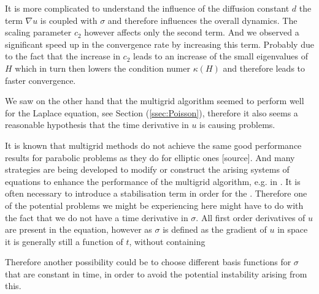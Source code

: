 \documentclass[../draft_1.tex]{subfiles}
\begin{document}
It is more complicated to understand the influence of the diffusion constant $d$ the term $\nabla u$ is coupled with $\sigma$ and therefore influences the overall dynamics. The scaling parameter $c_2$ however affects only the second term. And we observed a significant speed up in the convergence rate by increasing this term. Probably due to the fact that the increase in $c_2$ leads to an increase of the small eigenvalues of $H$ which in turn then lowers the condition numer $\kappa(H)$ and therefore leads to faster convergence. 


We saw on the other hand that the multigrid algorithm seemed to perform well for the Laplace equation, see Section (\ref{ssec:Poisson}), therefore it also seems a reasonable hypothesis that the time derivative in $u$ is causing problems.  

It is known that multigrid methods do not achieve the same good performance results for parabolic problems as they do for elliptic ones [source]. And many strategies are being developed to modify or construct the arising systems of equations to enhance the performance of the multigrid algorithm, e.g. in \cite{langer2017multipatch}. It is often necessary to introduce a stabilisation term in order for the . Therefore one of the potential problems we might be experiencing here might have to do with the fact that we do not have a time derivative in $\sigma$. All first order derivatives of $u$ are present in the equation, however as $\sigma$ is defined as the gradient of $u$ in space it is generally still a function of $t$, without containing 

Therefore another possibility could be to choose different basis functions for $\sigma$ that are constant in time, in order to avoid the potential instability arising from this. 
\end{document}
